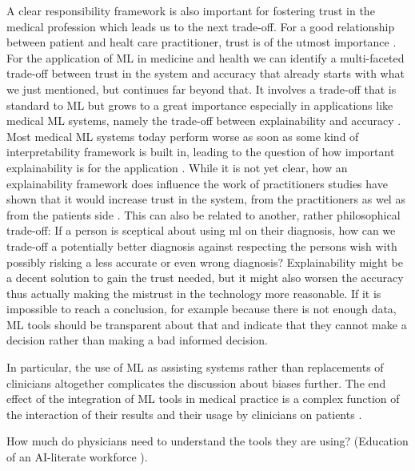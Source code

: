 A clear responsibility framework is also important for fostering trust in the medical profession which leads us to the next trade-off. For a good relationship between patient and healt care practitioner, trust is of the utmost importance \cite{clark2002trust}. For the application of ML in medicine and health we can identify a multi-faceted trade-off between trust in the system and accuracy that already starts with what we just mentioned, but continues far beyond that. It involves a trade-off that is standard to ML but grows to a great importance especially in applications like medical ML systems, namely the trade-off between explainability and accuracy \cite{topol2019high, kelly2019key}. Most medical ML systems today perform worse as soon as some kind of interpretability framework is built in, leading to the question of how important explainability is for the application \cite{luo2019balancing}. While it is not yet clear, how an explainability framework does influence the work of practitioners studies have shown that it would increase trust in the system, from the practitioners as wel as from the patients side \cite{diprose2020physician, topol2019high}. This can also be related to another, rather philosophical trade-off: If a person is sceptical about using ml on their diagnosis, how can we trade-off a potentially better diagnosis against respecting the persons wish with possibly risking a less accurate or even wrong diagnosis? Explainability might be a decent solution to gain the trust needed, but it might also worsen the accuracy thus actually making the mistrust in the technology more reasonable.
If it is impossible to reach a conclusion, for example because there is not enough data, ML tools should be transparent about that and indicate that they cannot make a decision rather than making a bad informed decision.  \cite{horgan2019artificial}




In particular, the use of ML as assisting systems rather than replacements of clinicians altogether complicates the discussion about biases further.
The end effect of the integration of ML tools in medical practice is a complex function of the interaction of their results and their usage by clinicians on patients \cite[p.~4]{Rajkomar2018}.


How much do physicians need to understand the tools they are using? (Education of an AI-literate workforce \cite{he2019practical}).



